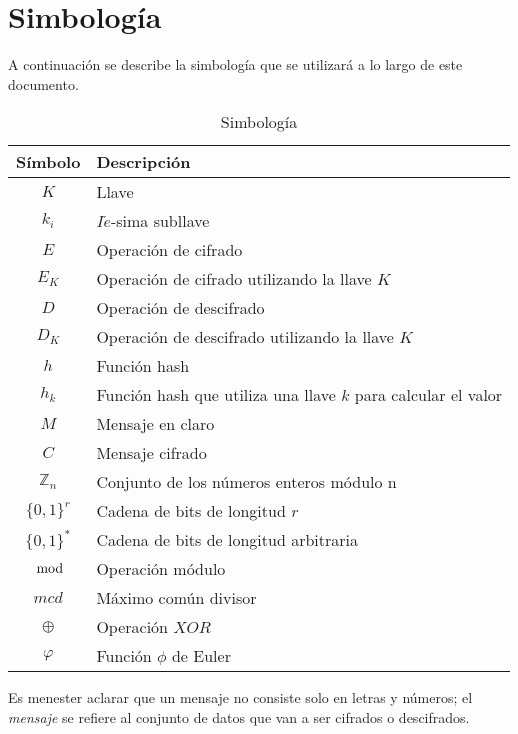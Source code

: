 %
%

\section*{Simbología}

A continuación se describe la simbología que se utilizará a lo largo de
este documento.

\begin{table}[H]
  \caption{Simbología}\label{tab:simb}
  \begin{center}
    \begin{tabular}{c|l}
      Símbolo & Descripción \\
      \hline
      $K$ & Llave \\
      \hline
      $k_i$ & $I\acute{e}$-sima subllave \\
      \hline
      $E$ & Operación de cifrado \\
      \hline
      $E_K$ & Operación de cifrado utilizando la llave $K$ \\
      \hline
      $D$ & Operación de descifrado \\
      \hline
      $D_K$ & Operación de descifrado utilizando la llave $K$ \\
      \hline
      $h$ & Función hash \\
      \hline
      $h_k$ & Función hash que utiliza una llave $k$ para calcular el valor\\
      \hline
      $M$ & Mensaje en claro\\
      \hline
      $C$ & Mensaje cifrado\\
      \hline
      $\mathbb{Z}_n$ & Conjunto de los números enteros módulo n\\
      \hline
      $\{0,1\}^r$ & Cadena de bits de longitud $r$ \\
      \hline
      $\{0,1\}^*$ & Cadena de bits de longitud arbitraria \\
      \hline
      $\mod$ & Operación módulo \\
      \hline
      $mcd$ & Máximo común divisor \\
      \hline
      $\oplus$ & Operación $XOR$ \\
      \hline
      $\varphi$ & Función $\phi$ de Euler \\
      \hline
    \end{tabular}
  \end{center}
\end{table}

Es menester aclarar que un mensaje no consiste solo en letras y números;
el \textit{mensaje} se refiere al conjunto de datos que van a ser
cifrados o descifrados.
